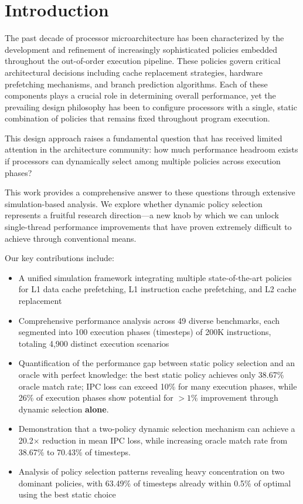 \documentclass[conference]{IEEEtran}
\begin{document}
\section{Introduction}

The past decade of processor microarchitecture has been characterized by the development and refinement of increasingly sophisticated policies embedded throughout the out-of-order execution pipeline. These policies govern critical architectural decisions including cache replacement strategies, hardware prefetching mechanisms, and branch prediction algorithms. Each of these components plays a crucial role in determining overall performance, yet the prevailing design philosophy has been to configure processors with a single, static combination of policies that remains fixed throughout program execution.

This design approach raises a fundamental question that has received limited attention in the architecture community: how much performance headroom exists if processors can dynamically select among multiple policies across execution phases?

This work provides a comprehensive answer to these questions through extensive simulation-based analysis. We explore whether dynamic policy selection represents a fruitful research direction---a new knob by which we can unlock single-thread performance improvements that have proven extremely difficult to achieve through conventional means.

Our key contributions include:

\begin{itemize}
\item A unified simulation framework integrating multiple state-of-the-art policies for L1 data cache prefetching, L1 instruction cache prefetching, and L2 cache replacement
\item Comprehensive performance analysis across 49 diverse benchmarks, each segmented into 100 execution phases (timesteps) of 200K instructions, totaling 4,900 distinct execution scenarios
\item Quantification of the performance gap between static policy selection and an oracle with perfect knowledge: the best static policy achieves only 38.67\% oracle match rate; IPC loss can exceed 10\% for many execution phases, while 26\% of execution phases show potential for $>1\%$ improvement through dynamic selection \textbf{alone}.
\item Demonstration that a two-policy dynamic selection mechanism can achieve a 20.2$\times$ reduction in mean IPC loss, while increasing oracle match rate from 38.67\% to 70.43\% of timesteps.
\item Analysis of policy selection patterns revealing heavy concentration on two dominant policies, with 63.49\% of timesteps already within 0.5\% of optimal using the best static choice
\end{itemize}
\end{document}
